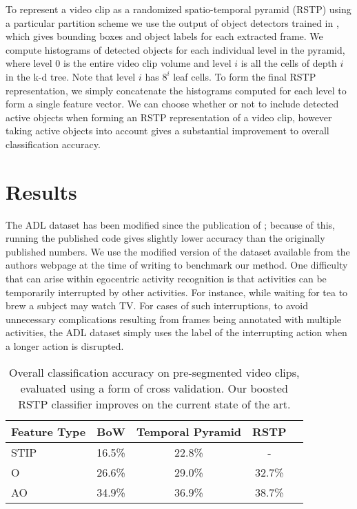 \documentclass{bmvc2k}
\begin{document}
   To represent a video clip as a randomized spatio-temporal pyramid (RSTP)
   using a particular partition scheme we use the output of object detectors
   trained in \cite{Ramanan12}, which gives bounding boxes and object
   labels for each extracted frame. We compute histograms of detected
   objects for each individual level in the pyramid,
   where level 0 is the entire video clip volume and level $i$ is all the
   cells of depth $i$ in the k-d tree. 
   Note that level $i$ has $8^i$ leaf
   cells. To form the final RSTP representation, we simply concatenate the
   histograms computed for each level to form a single feature vector.
   We can choose whether or not to include detected active objects when
   forming an RSTP representation of a video clip, however taking active
   objects into account gives a substantial improvement to overall
   classification accuracy.
   


\section{Results}
	The ADL dataset has been modified since the publication of
	\cite{Ramanan12}; because of this, running the published code gives
	slightly lower accuracy than the originally published numbers. We use the
  modified version of the dataset available from the authors webpage at the time of writing to
  benchmark our method. One difficulty that can arise within egocentric
  activity recognition is that activities can be temporarily interrupted by
  other activities. For instance, while waiting for tea to brew a subject
  may watch TV. For cases of such interruptions, to avoid unnecessary
  complications resulting from frames being annotated with multiple
  activities, the ADL dataset simply uses the label of the interrupting
  action when a longer action is disrupted.
	
	\begin{table}
		\begin{center}
			\begin{tabular}{|l|c|c|c|c|}
				\hline
        Feature Type & BoW & Temporal Pyramid & RSTP \\
				\hline\hline
        STIP & 16.5\% & 22.8\% & - \\ 
        \hline
       O & 26.6\% & 29.0\% & 32.7\%\\
        \hline
      AO & 34.9\% & 36.9\% & 38.7\%\\
				\hline
			\end{tabular}
		\end{center}
		\caption{Overall classification accuracy on pre-segmented video clips,
    evaluated using a form of cross validation. Our boosted RSTP classifier
  improves on the current state of the art.}
	\end{table}
	
\end{document}

